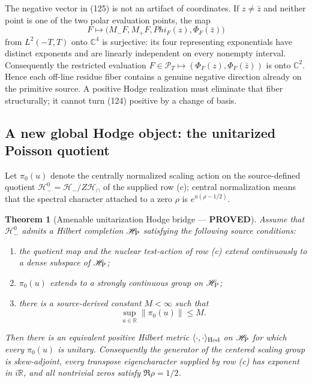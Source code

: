 \documentclass[11pt]{article}
\newtheorem{theorem}{Theorem}
\newcommand{\PROVED}{\textcolor{green!45!black}{\textbf{PROVED}}}
\begin{document}
The negative vector in (125) is not an artifact of coordinates.  If
$z\ne\bar z$ and neither point is one of the two polar evaluation points,
the map
\begin{equation}
 F\longmapsto\bigl(M_-F,M_+F,Phi_F(z),\Phi_F(\bar z)\bigr) \tag{126}
\end{equation}
from $L^2(-T,T)$ onto $\mathbb C^4$ is surjective: its four representing
exponentials have distinct exponents and are linearly independent on every
nonempty interval.  Consequently the restricted evaluation
$F\in\mathcal P_T\mapsto(\Phi_F(z),\Phi_F(\bar z))$ is onto
$\mathbb C^2$.  Hence each off-line residue fiber contains a genuine negative
direction already on the primitive source.  A positive Hodge realization
must eliminate that fiber structurally; it cannot turn (124) positive by a
change of basis.

\subsection{A new global Hodge object: the unitarized Poisson quotient}

Let $\pi_0(u)$ denote the centrally normalized scaling action on the
source-defined quotient $\mathcal H_-^0=\mathcal H_-/Z\mathcal H_\cap$ of
the supplied row (c); central normalization means that the spectral
character attached to a zero $\rho$ is $e^{u(\rho-1/2)}$.

\begin{theorem}[Amenable unitarization Hodge bridge --- \PROVED]
Assume that $\mathcal H_-^0$ admits a Hilbert completion
$\mathscr H_{\rm P}$ satisfying the following source conditions:
\begin{enumerate}
\item the quotient map and the nuclear test-action of row (c) extend
continuously to a dense subspace of $\mathscr H_{\rm P}$;
\item $\pi_0(u)$ extends to a strongly continuous group on
$\mathscr H_{\rm P}$;
\item there is a source-derived constant $M<\infty$ such that
\begin{equation}
 \sup_{u\in\mathbb R}\|\pi_0(u)\|\le M.               \tag{127}
\end{equation}
\end{enumerate}
Then there is an equivalent positive Hilbert metric
$\langle\cdot,\cdot\rangle_{\rm Hod}$ on $\mathscr H_{\rm P}$ for which
every $\pi_0(u)$ is unitary.  Consequently the generator of the centered
scaling group is skew-adjoint, every transpose eigencharacter supplied by
row (c) has exponent in $i\mathbb R$, and all nontrivial zeros satisfy
$\Re\rho=1/2$.
\end{theorem}
\end{document}
